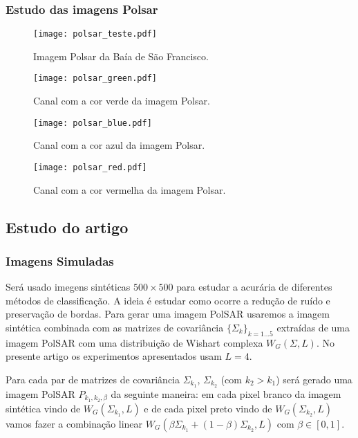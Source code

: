 \subsubsection{Estudo das imagens Polsar }

\begin{figure}[hbt]
\begin{minipage}[b]{0.450\linewidth}
\texttt{[image: polsar\_teste.pdf]}
\caption{Imagem Polsar da Baía de São Francisco.}
\label{fig5:sobel}
\end{minipage}\hfill
\begin{minipage}[b]{0.450\linewidth}
\texttt{[image: polsar\_green.pdf]}
\caption{Canal com a cor verde da imagem Polsar.}
\label{fig5:Log}
\end{minipage}
\end{figure}

\begin{figure}[!htb]
\begin{minipage}[b]{0.450\linewidth}
\texttt{[image: polsar\_blue.pdf]}
\caption{Canal com a cor azul da imagem Polsar.}
\label{fig5:sobel}
\end{minipage}\hfill
\begin{minipage}[b]{0.450\linewidth}
\texttt{[image: polsar\_red.pdf]}
\caption{Canal com a cor vermelha da imagem Polsar.}
\label{fig5:Log}
\end{minipage}
\end{figure}

\subsection{Estudo do artigo  \cite{gamf}}
\subsubsection{Imagens Simuladas}

Será usado imegens sintéticas $500 \times 500$ para estudar a acurária de diferentes métodos de classificação. A ideia é estudar como ocorre a redução de ruído e preservação de bordas. Para gerar uma imagem PolSAR usaremos a imagem sintética combinada com as matrizes de covariância $\{\Sigma_{k}\}_{k=1\dots5}$ extraídas de uma imagem PolSAR com uma distribuição de Wishart complexa $W_G(\Sigma, L)$. No presente artigo os experimentos apresentados usam $L=4$.

Para cada par de matrizes de covariância $\Sigma_{k_1}$, $\Sigma_{k_2}$ (com $k_2>k_1$) será gerado uma imagem PolSAR $P_{k_1,k_2,\beta}$ da seguinte maneira: em cada pixel branco da imagem sintética vindo de $W_G(\Sigma_{k_1}, L)$ e de cada pixel preto vindo de $W_G(\Sigma_{k_2},L)$ vamos fazer a combinação linear $W_G(\beta\Sigma_{k_1}+(1-\beta)\Sigma_{k_2}, L)$ com $\beta\in[0,1]$.

